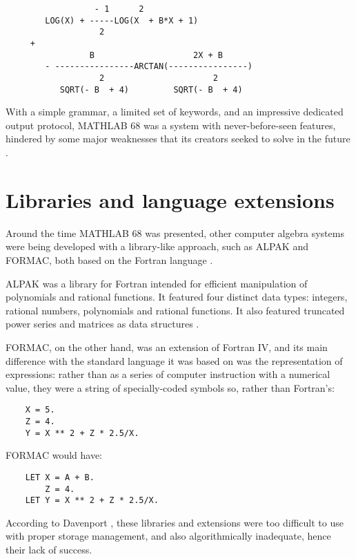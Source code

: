 \begin{verbatim}
                  - 1      2
        LOG(X) + -----LOG(X  + B*X + 1)
                   2
     + 
                 B                    2X + B
        - ----------------ARCTAN(----------------)
                   2                      2
           SQRT(- B  + 4)         SQRT(- B  + 4)
\end{verbatim}

With a simple grammar, a limited set of keywords, and an impressive dedicated output protocol, MATHLAB 68 was a system with never-before-seen features, hindered by some major weaknesses that its creators seeked to solve in the future \parencite{engelman1971legacy}.

\section{Libraries and language extensions}\label{sec:libraries-and-language-extensions}
Around the time MATHLAB 68 was presented, other computer algebra systems were being developed with a library-like approach, such as ALPAK and FORMAC, both based on the Fortran language \parencite{davenport1994computer}.

ALPAK was a library for Fortran intended for efficient manipulation of polynomials and rational functions. It featured four distinct data types: integers, rational numbers, polynomials and rational functions. It also featured truncated power series and matrices as data structures \parencite{brown1966language}.

FORMAC, on the other hand, was an extension of Fortran IV, and its main difference with the standard language it was based on was the representation of expressions: rather than as a series of computer instruction with a numerical value, they were a string of specially-coded symbols so, rather than Fortran's:

\begin{verbatim}
    X = 5.
    Z = 4.
    Y = X ** 2 + Z * 2.5/X.
\end{verbatim}

FORMAC would have:

\begin{verbatim}
    LET X = A + B.
        Z = 4.
    LET Y = X ** 2 + Z * 2.5/X.
\end{verbatim}

According to Davenport \parencite*{davenport1994computer}, these libraries and extensions were too difficult to use with proper storage management, and also algorithmically inadequate, hence their lack of success.

